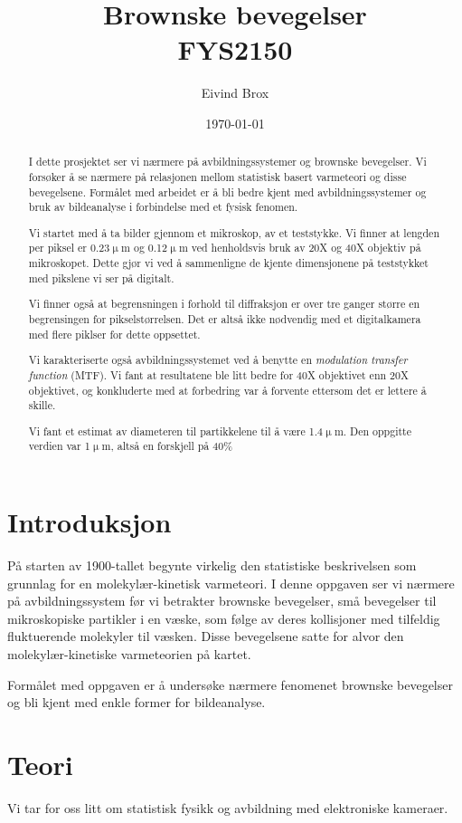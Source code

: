 \documentclass[a4paper,11pt, twocolumn]{article}
\title{Brownske bevegelser \\ FYS2150}
\author{Eivind Brox}
\date{\today}
\begin{document}
\maketitle

\begin{abstract}
	I dette prosjektet ser vi nærmere på avbildningssystemer og brownske bevegelser. Vi forsøker å se nærmere på relasjonen mellom statistisk basert varmeteori og disse bevegelsene.
	Formålet med arbeidet er å bli bedre kjent med avbildningssystemer og bruk av bildeanalyse i forbindelse med et fysisk fenomen.

Vi startet med å ta bilder gjennom et mikroskop, av et teststykke. Vi finner at lengden per piksel er 0.23$\upmu$m og 0.12$\upmu$m ved henholdsvis bruk av 20X og 40X objektiv på mikroskopet. Dette gjør vi ved å sammenligne de kjente dimensjonene på teststykket med pikslene vi ser på digitalt.

Vi finner også at begrensningen i forhold til diffraksjon er over tre ganger større en begrensingen for pikselstørrelsen. Det er altså ikke nødvendig med et digitalkamera med flere piklser for dette oppsettet.

Vi karakteriserte også avbildningssystemet ved å benytte en \textit{modulation transfer function} (MTF). Vi fant at resultatene ble litt bedre for 40X objektivet enn 20X objektivet, og konkluderte med at forbedring var å forvente ettersom det er lettere å skille.

Vi fant et estimat av diameteren til partikkelene til å være 1.4$\upmu$m. Den oppgitte verdien var 1$\upmu$m, altså en forskjell på 40\%
\end{abstract}

\section{Introduksjon}
	På starten av 1900-tallet begynte virkelig den statistiske beskrivelsen som grunnlag for en molekylær-kinetisk varmeteori. I denne oppgaven ser vi nærmere på avbildningssystem før vi betrakter brownske bevegelser, små bevegelser til mikroskopiske partikler i en væske, som følge av deres kollisjoner med tilfeldig fluktuerende molekyler til væsken. Disse bevegelsene satte for alvor den molekylær-kinetiske varmeteorien på kartet.

Formålet med oppgaven er å undersøke nærmere fenomenet brownske bevegelser og bli kjent med enkle former for bildeanalyse.
\section{Teori}
Vi tar for oss litt om statistisk fysikk og avbildning med elektroniske kameraer. 
\end{document}
